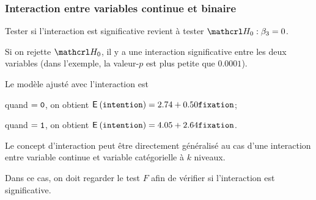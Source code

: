 \documentclass[xcolor={dvipsnames}]{beamer}
\begin{document}
\begin{frame}
\frametitle{Interaction entre variables continue et binaire}
\bi
\item Tester si l'interaction est significative revient à tester $\Hy_0: \beta_3=0$.
\item Si on rejette $\Hy_0$, il y a une interaction significative entre les deux variables (dans l'exemple, la valeur-$p$ est plus petite que $0.0001$). 
\item Le modèle ajusté avec l'interaction est
\bi
\item quand $=\texttt{0}$, on obtient ${\mathsf E}_{}\left(\texttt{intention}\right)=2.74+0.50  \texttt{fixation}$;
\item quand $=\texttt{1}$, on obtient ${\mathsf E}_{}\left(\texttt{intention}\right)=4.05+2.64  \texttt{fixation}$.
\ei
\item Le concept d'interaction peut être directement généralisé au cas d'une interaction entre variable continue et variable catégorielle à $k$ niveaux.
\bi    
\item Dans ce cas, on doit regarder le test $F$ afin de vérifier si l'interaction est significative.
\ei
 \ei
\end{frame}


\end{document}
